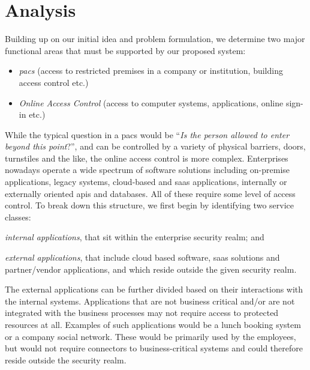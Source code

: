 \section{Analysis}\label{sec:analysis}

Building up on our initial idea and problem formulation, we determine two major functional areas that must be supported by our proposed system:

\begin{itemize}[noitemsep]
    \item \textit{\acrfull{pacs}} (access to restricted premises in a company or institution, building access control etc.)
    \item \textit{Online Access Control} (access to computer systems, applications, online sign-in etc.)
\end{itemize}

While the  typical question in a \acrshort{pacs} would be ``\textit{Is the person allowed to enter beyond this point}?'', and can be controlled by a variety of physical barriers, doors, turnstiles and the like, the online access control is more complex. Enterprises nowadays operate a wide spectrum of software solutions including on-premise applications, legacy systems, cloud-based and \acrshort{saas} applications, internally or externally oriented \acrshort{api}s and databases. All of these require some level of access control. To break down this structure, we first begin by identifying two service classes:
\begin{enumerate*}[label=(\roman*)]
    \item \textit{internal applications}, that sit within the enterprise security realm; and 
    \item \textit{external applications}, that include cloud based software, \acrshort{saas} solutions and partner/vendor applications, and which reside outside the given security realm.
\end{enumerate*}

The external applications can be further divided based on their interactions with the internal systems. Applications that are not business critical and/or are not integrated with the business processes may not require access to protected resources at all. Examples of such applications would be a lunch booking system or a company social network. These would be primarily used by the employees, but would not require connectors to business-critical systems and could therefore reside outside the security realm.

